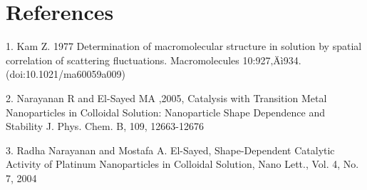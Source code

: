 \documentclass [11pt,fleqn]{article}
\def \be {\begin{equation}}
\def \ee {\end{equation}}
\begin{document}

\section{References}

1. Kam Z. 1977 Determination of macromolecular structure in solution by spatial correlation of scattering fluctuations. Macromolecules 10:927‚Äì934. (doi:10.1021/ma60059a009)

2. Narayanan R and El-Sayed MA ,2005, Catalysis with Transition Metal Nanoparticles in Colloidal Solution: Nanoparticle Shape Dependence and Stability J. Phys. Chem. B, 109, 12663-12676

3. Radha Narayanan and Mostafa A. El-Sayed, Shape-Dependent Catalytic Activity of Platinum Nanoparticles in Colloidal Solution, Nano Lett., Vol. 4, No. 7, 2004
\end{document}
